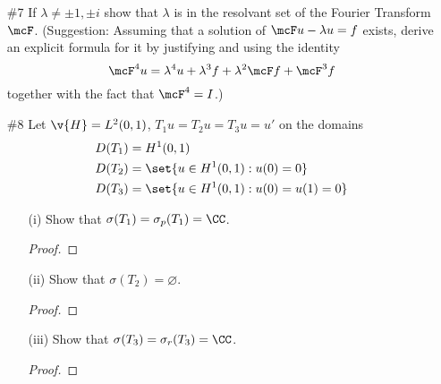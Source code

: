 \documentclass[11pt, oneside]{article}
\begin{document}
\begin{enumerate}
\begin{enumerate}
      \item[(b)]
        Show that $\sigma_c(T) = \set{\lambda: \abs{\lambda}= 1}$.

        \begin{proof}
          
        \end{proof}

      \item[(c)]
        Show that $\sigma_r(T) = \set{\lambda: \abs{\lambda} < 1}$.
    \end{enumerate}

  \pagebreak
  \item[\#7]
    If $\lambda \neq \pm 1, \pm i$ show that $\lambda$ is in the resolvant set
    of the Fourier Transform $\mcF$.
    (Suggestion: Assuming that a solution of $\mcF u - \lambda u = f$ exists,
    derive an explicit formula for it by justifying and using the identity
    \[
      \mcF^4 u = \lambda^4 u + \lambda^3 f + \lambda^2 \mcF f + \mcF^3 f
    \]
    together with the fact that $\mcF^4 = I$.)

  \pagebreak
  \item[\#8]
    Let $\v{H} = L^2(0, 1)$, $T_1 u = T_2 u = T_3 u = u'$ on the domains
    \begin{align*}
      D(T_1) &= H^1(0, 1) \\
      D(T_2) &= \set{u \in H^1(0,1): u(0) = 0} \\
      D(T_3) &= \set{u \in H^1(0, 1): u(0) = u(1) = 0}
    \end{align*}
    \begin{enumerate}
      \item[(i)]
        Show that $\sigma(T_1) = \sigma_p(T_1) = \CC$.

        \begin{proof}
          
        \end{proof}

      \item[(ii)]
        Show that $\sigma(T_2) = \varnothing$.

        \begin{proof}
          
        \end{proof}

      \item[(iii)]
        Show that $\sigma(T_3) = \sigma_r(T_3) = \CC$.

        \begin{proof}
          

\end{proof}
\end{enumerate}
\end{enumerate}
\end{document}
